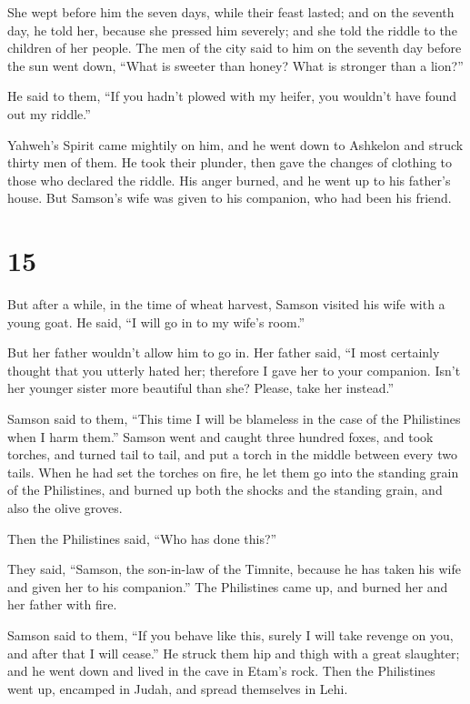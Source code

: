  She wept before him the seven days, while their feast
lasted; and on the seventh day, he told her, because she pressed him
severely; and she told the riddle to the children of her people.
 The men of the city said to him on the seventh day
before the sun went down, ``What is sweeter than honey? What is stronger
than a lion?''

He said to them, ``If you hadn't plowed with my heifer, you wouldn't
have found out my riddle.''

 Yahweh's Spirit came mightily on him, and he went down
to Ashkelon and struck thirty men of them. He took their plunder, then
gave the changes of clothing to those who declared the riddle. His anger
burned, and he went up to his father's house.  But
Samson's wife was given to his companion, who had been his friend.

\hypertarget{section-14}{%
\section{15}\label{section-14}}

 But after a while, in the time of wheat harvest, Samson
visited his wife with a young goat. He said, ``I will go in to my wife's
room.''

But her father wouldn't allow him to go in.  Her father
said, ``I most certainly thought that you utterly hated her; therefore I
gave her to your companion. Isn't her younger sister more beautiful than
she? Please, take her instead.''

 Samson said to them, ``This time I will be blameless in
the case of the Philistines when I harm them.''  Samson
went and caught three hundred foxes, and took torches, and turned tail
to tail, and put a torch in the middle between every two tails.
 When he had set the torches on fire, he let them go into
the standing grain of the Philistines, and burned up both the shocks and
the standing grain, and also the olive groves.

 Then the Philistines said, ``Who has done this?''

They said, ``Samson, the son-in-law of the Timnite, because he has taken
his wife and given her to his companion.'' The Philistines came up, and
burned her and her father with fire.

 Samson said to them, ``If you behave like this, surely I
will take revenge on you, and after that I will cease.'' 
He struck them hip and thigh with a great slaughter; and he went down
and lived in the cave in Etam's rock.  Then the
Philistines went up, encamped in Judah, and spread themselves in Lehi.


